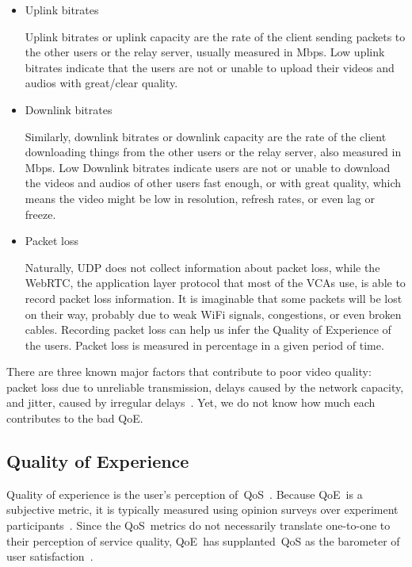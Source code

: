         \begin{itemize}
            \item Uplink bitrates
            
                Uplink bitrates or uplink capacity are the rate of the client sending packets to the other users or the relay server, usually measured in Mbps. Low uplink bitrates indicate that the users are not or unable to upload their videos and audios with great/clear quality. 

            \item Downlink bitrates
            
                Similarly, downlink bitrates or downlink capacity are the rate of the client downloading things from the other users or the relay server, also measured in Mbps. Low Downlink bitrates indicate users are not or unable to download the videos and audios of other users fast enough, or with great quality, which means the video might be low in resolution, refresh rates, or even lag or freeze.

            \item Packet loss
            
                Naturally, UDP does not collect information about packet loss, while the WebRTC, the application layer protocol that most of the VCAs use, is able to record packet loss information. It is imaginable that some packets will be lost on their way, probably due to weak WiFi signals, congestions, or even broken cables. Recording packet loss can help us infer the Quality of Experience of the users. Packet loss is measured in percentage in a given period of time. 

        \end{itemize}

        

        There are three known major factors that contribute to poor video quality: packet loss due to unreliable transmission, delays caused by the network capacity, and jitter, caused by irregular delays~\autocite{ChenYanjiao2015FQtQ}. Yet, we do not know how much each contributes to the bad QoE. 

    \subsection{Quality of Experience}\label{introduction:qoe}
        Quality of experience is the user's perception of~QoS~\autocite{ChenYanjiao2015FQtQ}. Because QoE~is a subjective metric, it is typically measured using opinion surveys over experiment participants~\autocite{ChenYanjiao2015FQtQ,RodrriguezDemóstenesZ2014Vqai}. Since the QoS~metrics do not necessarily translate one-to-one to their perception of service quality, QoE~has supplanted~QoS as the barometer of user satisfaction~\autocite{DinakiHosseinEbrahimi2021FVQW}.

